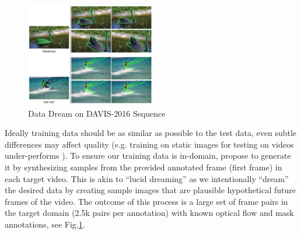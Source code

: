 \begin{figure}[ht]
    \centering
    \includegraphics[width=0.5\textwidth]{./figure/data_dream.png}
    \caption{Data Dream on DAVIS-2016 Sequence}
    \label{data dream}
\end{figure}


Ideally training data should be as similar as possible to the test data, even subtle differences may affect quality (e.g. training on static images for testing on videos under-performs \cite{tang2012shifting}). To ensure our training data is in-domain, \cite{LucidTracker} propose to generate it by synthesizing samples from the provided annotated frame (first frame) in each target video. This is akin to “lucid dreaming” as we intentionally “dream” the desired data by creating sample images that are plausible hypothetical future frames of the video. The outcome of this process is a large set of frame pairs in the target domain (2.5k pairs per annotation) with known optical flow and mask annotations, see Fig.\ref{data dream}.

